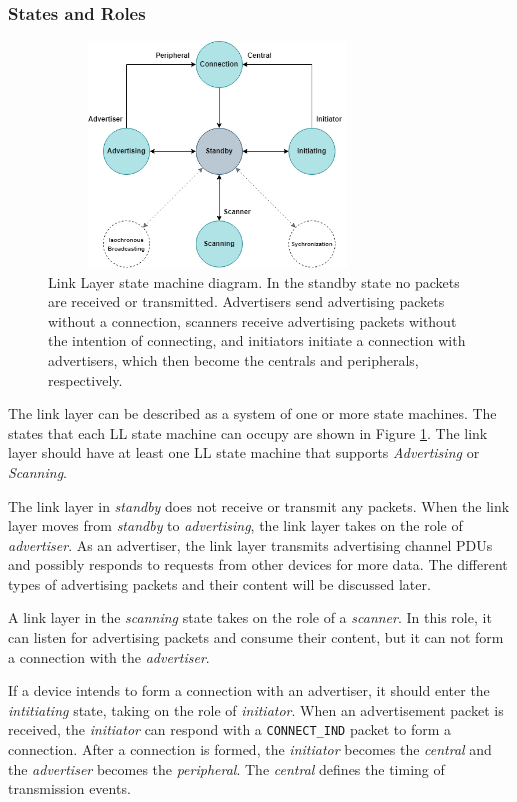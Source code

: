 \subsubsection{States and Roles}
\begin{figure}[]
    \centering
    \includegraphics[width=0.8\textwidth,height=6cm,keepaspectratio=true]{images/ll_states/ll_states.drawio.png}
    \caption{
        Link Layer state machine diagram. In the standby state no packets are received or transmitted. Advertisers send advertising packets without a connection, scanners receive advertising packets without the intention of connecting, and initiators initiate a connection with advertisers, which then become the centrals and peripherals, respectively.
    }
    \label{fig:ll_states}
\end{figure}
The link layer can be described as a system of one or more state machines. The states that each LL state machine can occupy are shown in Figure \ref{fig:ll_states}. The link layer should have at least one LL state machine that supports \textit{Advertising} or \textit{Scanning}. 

The link layer in \textit{standby} does not receive or transmit any packets. When the link layer moves from \textit{standby} to \textit{advertising}, the link layer takes on the role of \textit{advertiser}. As an advertiser, the link layer transmits advertising channel PDUs and possibly responds to requests from other devices for more data. The different types of advertising packets and their content will be discussed later.

A link layer in the \textit{scanning} state takes on the role of a \textit{scanner}. In this role, it can listen for advertising packets and consume their content, but it can not form a connection with the \textit{advertiser}.

If a device intends to form a connection with an advertiser, it should enter the \textit{intitiating} state, taking on the role of \textit{initiator}. When an advertisement packet is received, the \textit{initiator} can respond with a \texttt{CONNECT\_IND} packet to form a connection. After a connection is formed, the \textit{initiator} becomes the \textit{central} and the \textit{advertiser} becomes the \textit{peripheral}. The \textit{central} defines the timing of transmission events.

